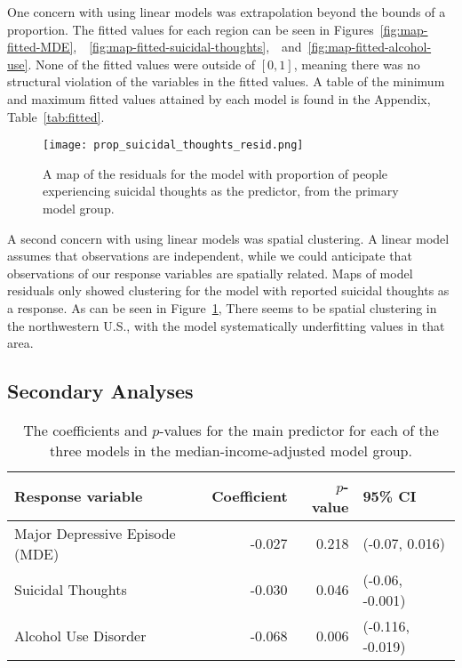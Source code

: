 \documentclass{article}
\begin{document}
One concern with using linear models was extrapolation
beyond the bounds of a proportion.
The fitted values for each region can be seen in
Figures~\ref{fig:map-fitted-MDE},\
~\ref{fig:map-fitted-suicidal-thoughts},\
~and~\ref{fig:map-fitted-alcohol-use}.
None of the fitted values were outside of $[0,1]$,
meaning there was no structural violation of the
variables in the fitted values.
A table of the minimum and maximum fitted values
attained by each model is found in the Appendix,
Table~\ref{tab:fitted}.

\begin{figure}[!htb]
    \centering
    \texttt{[image: prop\_suicidal\_thoughts\_resid.png]}
    \caption{\label{fig:map-resid-suicidal-thoughts}A map of the residuals
    for the model with
    proportion of people experiencing
    suicidal thoughts as the predictor,
    from the primary model group.
    }
\end{figure}

A second concern with using linear models was spatial clustering.
A linear model assumes that observations are independent,
while we could anticipate that observations of our response variables
are spatially related.
Maps of model residuals only showed clustering for
the model with reported suicidal thoughts as a response.
As can be seen in Figure~\ref{fig:map-resid-suicidal-thoughts},
There seems to be spatial clustering
in the northwestern U.S.,
with the model systematically underfitting values
in that area.

\subsection{Secondary Analyses}

\begin{table}[t]
\begin{center}
\begin{tabular}{l r r l}
    \toprule
    Response variable & Coefficient & $p$-value & 95\% CI\\
    \midrule
    Major Depressive Episode (MDE) & -0.027 & 0.218 & (-0.07, 0.016)\\
    Suicidal Thoughts & -0.030 & 0.046 & (-0.06, -0.001)\\
    Alcohol Use Disorder & -0.068 & 0.006 & (-0.116, -0.019)\\
    \bottomrule
\end{tabular}
\caption{\label{tab:median-income-model-results} The coefficients and $p$-values
    for the main predictor for each of the three models
    in the median-income-adjusted model group.
}
\end{center}
\end{table}
\end{document}
